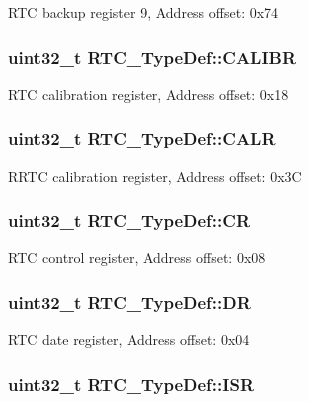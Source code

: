R\-T\-C backup register 9, Address offset\-: 0x74 \hypertarget{struct_r_t_c___type_def_a2403d29b2bfffb734ebef6642c0d2724}{
\subsubsection[{C\-A\-L\-I\-B\-R}]{ uint32\-\_\-t R\-T\-C\-\_\-\-Type\-Def\-::\-C\-A\-L\-I\-B\-R}}\label{struct_r_t_c___type_def_a2403d29b2bfffb734ebef6642c0d2724}
R\-T\-C calibration register, Address offset\-: 0x18 \hypertarget{struct_r_t_c___type_def_aea66ea813830c2f3ff207464794397a4}{
\subsubsection[{C\-A\-L\-R}]{ uint32\-\_\-t R\-T\-C\-\_\-\-Type\-Def\-::\-C\-A\-L\-R}}\label{struct_r_t_c___type_def_aea66ea813830c2f3ff207464794397a4}
R\-R\-T\-C calibration register, Address offset\-: 0x3\-C \hypertarget{struct_r_t_c___type_def_a731d9209ce40dce6ea61fcc6f818c892}{
\subsubsection[{C\-R}]{ uint32\-\_\-t R\-T\-C\-\_\-\-Type\-Def\-::\-C\-R}}\label{struct_r_t_c___type_def_a731d9209ce40dce6ea61fcc6f818c892}
R\-T\-C control register, Address offset\-: 0x08 \hypertarget{struct_r_t_c___type_def_a8750eae683cb3d382476dc7cdcd92b96}{
\subsubsection[{D\-R}]{ uint32\-\_\-t R\-T\-C\-\_\-\-Type\-Def\-::\-D\-R}}\label{struct_r_t_c___type_def_a8750eae683cb3d382476dc7cdcd92b96}
R\-T\-C date register, Address offset\-: 0x04 \hypertarget{struct_r_t_c___type_def_a5a7b104d80b48b5708b50cdc487d6a78}{
\subsubsection[{I\-S\-R}]{ uint32\-\_\-t R\-T\-C\-\_\-\-Type\-Def\-::\-I\-S\-R}}\label{struct_r_t_c___type_def_a5a7b104d80b48b5708b50cdc487d6a78}
